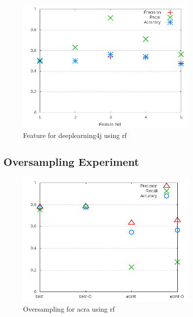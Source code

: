 \begin{figure}[h]
    \centering
        \includegraphics[width=0.8\textwidth]{images/rf/test_3/deeplearning4j_sample_range}
    \caption{Feature for deeplearning4j using \gls{rf}}
    \label{fig:test_3_deeplearning4j_rf}
\end{figure}

\subsection{Oversampling Experiment}

\begin{figure}[!h]
    \centering

        \includegraphics[width=0.8\textwidth]{images/rf/test_4/acra_sample_range}
        \caption{Oversampling for acra using \gls{rf}}
        \label{fig:test_4_acra_rf}
\end{figure}

